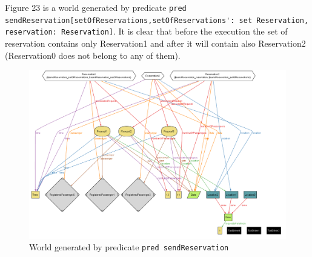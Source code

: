 \begin{landscape}

Figure 23 is a world generated by predicate \lstinline!pred sendReservation[setOfReservations,setOfReservations': set Reservation, reservation: Reservation]!.
It is clear that before the execution the set of reservation contains
only Reservation1 and after it will contain also Reservation2 (Reservation0
does not belong to any of them).

\begin{figure}[H]
\begin{centering}
\includegraphics[scale=0.5]{alloy/instances/sendReservation}
\par\end{centering}

\protect\caption{World generated by predicate \lstinline!pred sendReservation!}
\end{figure}


\end{landscape}

\clearpage{}


